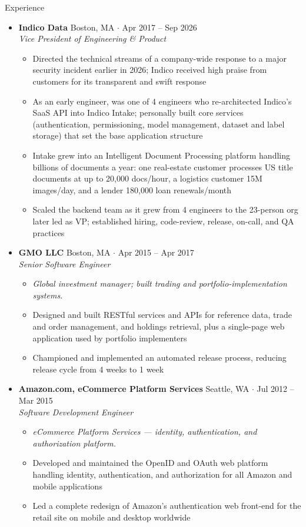 \documentclass[10pt,oneside]{article}
\newenvironment{ressection}[1]{
  \vspace{4pt}
  {\fontfamily{phv}\selectfont\Large#1}
  \begin{itemize}
    \vspace{3pt}
}{
  \end{itemize}
}
\newcommand{\ressubitem}[1]{
  \vspace{-1pt}
\item \begin{flushleft} #1 \end{flushleft}
}
\newcommand{\rescontext}[1]{
  \vspace{-3pt}
\item[] \begin{flushleft} \textit{\small #1} \end{flushleft}
}
\newcommand{\resbigitem}[3]{
  \vspace{-5pt}
\item
  \textbf{#1} \hfill #2 \\
  \textit{#3}
}
\newenvironment{ressubsec}[3]{
  \resbigitem{#1}{#2}{#3}
  \vspace{-2pt}
  \begin{itemize}
}{
  \end{itemize}
}
\begin{document}
\begin{ressection}{Experience}
\begin{ressubsec}{Indico Data}{Boston, MA \; $\cdot$ \; Apr 2017 -- Sep 2026}{Vice President of Engineering \& Product}
    \ressubitem{Directed the technical streams of a company-wide response to a major security incident earlier in 2026; Indico received high praise from customers for its transparent and swift response}
    \ressubitem{As an early engineer, was one of 4 engineers who re-architected Indico's SaaS API into Indico Intake; personally built core services (authentication, permissioning, model management, dataset and label storage) that set the base application structure}
    \ressubitem{Intake grew into an Intelligent Document Processing platform handling billions of documents a year: one real-estate customer processes US title documents at up to 20{,}000 docs/hour, a logistics customer 15M images/day, and a lender 180{,}000 loan renewals/month}
    \ressubitem{Scaled the backend team as it grew from 4 engineers to the 23-person org later led as VP; established hiring, code-review, release, on-call, and QA practices}
  \end{ressubsec}

  \begin{ressubsec}{GMO LLC}{Boston, MA \; $\cdot$ \; Apr 2015 -- Apr 2017}{Senior Software Engineer}
    \rescontext{Global investment manager; built trading and portfolio-implementation systems.}
    \ressubitem{Designed and built RESTful services and APIs for reference data, trade and order management, and holdings retrieval, plus a single-page web application used by portfolio implementers}
    \ressubitem{Championed and implemented an automated release process, reducing release cycle from 4 weeks to 1 week}
  \end{ressubsec}

  \begin{ressubsec}{Amazon.com, eCommerce Platform Services}{Seattle, WA \; $\cdot$ \; Jul 2012 -- Mar 2015}{Software Development Engineer}
    \rescontext{eCommerce Platform Services --- identity, authentication, and authorization platform.}
    \ressubitem{Developed and maintained the OpenID and OAuth web platform handling identity, authentication, and authorization for all Amazon and mobile applications}
    \ressubitem{Led a complete redesign of Amazon's authentication web front-end for the retail site on mobile and desktop worldwide}
  \end{ressubsec}

\end{ressection}
\end{document}
